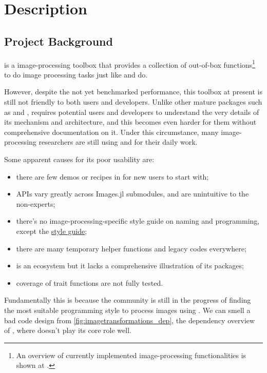
\section{Description}\label{sec:project}

\subsection*{Project Background}

\repoimages{} is a \langjulia image-processing toolbox that provides a collection of out-of-box functions\footnote{An overview of currently implemented image-processing functionalities is shown at \apicomparison.} to do image processing tasks just like \reposcikitimage{} and \matlabimageprocessing{} do.

However, despite the not yet benchmarked performance, this toolbox at present is still not friendly to both users and developers. Unlike other mature \langjulia{} packages such as \repojump and \repogpuarrays, \images{} requires potential users and developers to understand the very details of its mechanism and architecture, and this becomes even harder for them without comprehensive documentation on it. Under this circumstance, many image-processing researchers are still using \langpython and \langmatlab for their daily work.

Some apparent causes for its poor usability are:
{\normalsize
\begin{itemize}
    \item there are few demos or recipes in \images{} for new users to start with;
    \item APIs vary greatly across Images.jl submodules, and are unintuitive to the non-experts;
    \item there's no image-processing-specific style guide on naming and programming, except the \langjulia{} \href{https://docs.julialang.org/en/v1/manual/style-guide/}{style guide};
    \item there are many temporary helper functions and legacy codes everywhere;
    \item \images{} is an ecosystem but it lacks a comprehensive illustration of its packages;
    \item coverage of trait functions are not fully tested.
\end{itemize}
}
Fundamentally this is because the community is still in the progress of finding the most suitable programming style to process images using \langjulia. We can smell a bad code design from \cref{fig:imagetransformations_dep}, the dependency overview of \imagetransformations{}, where \imagecore{} doesn't play its core role well.

